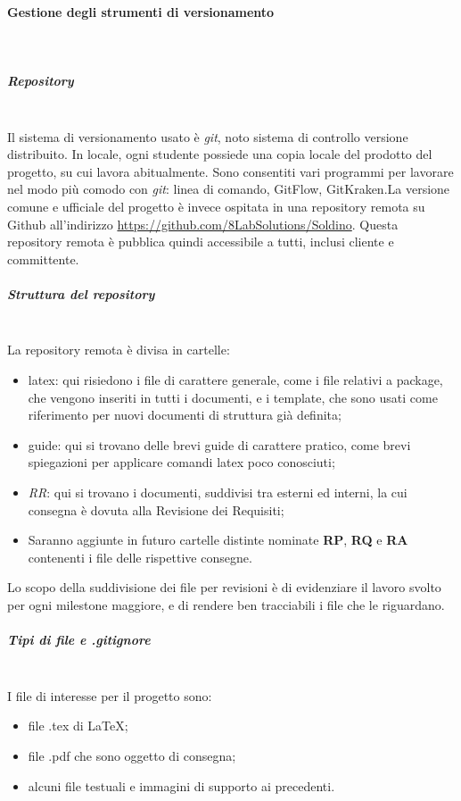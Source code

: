 			\paragraph{Gestione degli strumenti di versionamento} \mbox{}\\
			\subparagraph{Repository} \mbox{}\\
			Il sistema di versionamento usato è \textit{git}, noto sistema di controllo versione distribuito. In locale, ogni studente possiede una copia locale del prodotto del progetto, su cui lavora abitualmente. Sono consentiti vari programmi per lavorare nel modo più comodo con \textit{git}: linea di comando, GitFlow, GitKraken.\newline La versione comune e ufficiale del progetto è invece ospitata in una repository remota su Github all'indirizzo  
			\url{https://github.com/8LabSolutions/Soldino}. Questa repository remota è pubblica quindi accessibile a tutti, inclusi cliente e committente.
			\subparagraph{Struttura del repository} \mbox{}\\
			La repository remota è divisa in cartelle:
			\begin{itemize}
				\item latex: qui risiedono i file di carattere generale, come i file relativi a package, che vengono inseriti in tutti i documenti, e i template, che sono usati come riferimento per nuovi documenti di struttura già definita;
				\item guide: qui si trovano delle brevi guide di carattere pratico, come brevi spiegazioni per applicare comandi latex poco conosciuti;
				\item \textit{RR}: qui si trovano i documenti, suddivisi tra esterni ed interni, la cui consegna è dovuta alla Revisione dei Requisiti;
				\item Saranno aggiunte in futuro cartelle distinte nominate \textbf{RP}, \textbf{RQ} e \textbf{RA} contenenti i file delle rispettive consegne.
			\end{itemize}
			Lo scopo della suddivisione dei file per revisioni è di evidenziare il lavoro svolto per ogni milestone maggiore, e di rendere ben tracciabili i file che le riguardano.
			\subparagraph{Tipi di file e .gitignore} \mbox{}\\
			I file di interesse per il progetto sono:
			\begin{itemize}
				\item file .tex di \LaTeX{};
				\item file .pdf che sono oggetto di consegna;
				\item alcuni file testuali e immagini di supporto ai precedenti.
			\end{itemize}			
